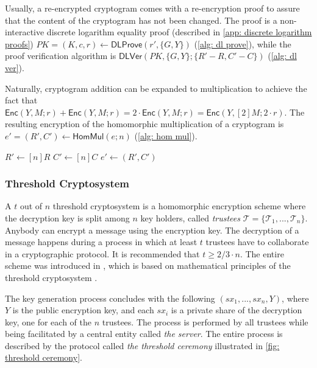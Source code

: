 Usually, a re-encrypted cryptogram comes with a re-encryption proof to assure that the content of the cryptogram has not been changed. The proof is a non-interactive discrete logarithm equality proof (described in \cref{app: discrete logarithm proofs}) $PK = (K, c, r) \gets \mathsf{DLProve} (r', \{ G, Y \})$ (\cref{alg: dl prove}), while the proof verification algorithm is $\mathsf{DLVer} (PK, \{ G, Y \}; \{ R'-R, C'-C \})$ (\cref{alg: dl ver}).

Naturally, cryptogram addition can be expanded to multiplication to achieve the fact that $\mathsf{Enc}(Y, M; r) + \mathsf{Enc}(Y, M; r) = 2 \cdot \mathsf{Enc}(Y, M; r) = \mathsf{Enc}(Y, [2]M; 2 \cdot r)$. The resulting encryption of the homomorphic multiplication of a cryptogram is $e' = (R', C') \gets \mathsf{HomMul}(e; n)$ (\cref{alg: hom mul}).

\begin{algorithm}[ht]
    \DontPrintSemicolon
    \caption{$\mathsf{HomMul} (e; n)$}
    \label{alg: hom mul}
    
    $R' \gets [n]R$ \;
    $C' \gets [n]C$ \;
    $e' \gets (R', C')$ \;
     
\end{algorithm}


\subsubsection{Threshold Cryptosystem} \label{app: threshold cryptosystem}
A $t$ out of $n$ threshold cryptosystem is a homomorphic encryption scheme where the decryption key is split among $n$ key holders, called \textit{trustees} $\boldsymbol{\mathcal{T}} = \{ \mathcal{T}_1, ..., \mathcal{T}_n \}$. Anybody can encrypt a message using the encryption key. The decryption of a message happens during a process in which at least $t$ trustees have to collaborate in a cryptographic protocol. It is recommended that $t \geq 2/3 \cdot n$. The entire scheme was introduced in \cite{Pedersen91}, which is based on mathematical principles of the threshold cryptosystem \cite{Desmedt89, Shamir79}.

The key generation process concludes with the following $(sx_1, ..., sx_n, Y)$, where $Y$ is the public encryption key, and each $sx_i$ is a private share of the decryption key, one for each of the $n$ trustees. The process is performed by all trustees while being facilitated by a central entity called \textit{the server}. The entire process is described by the protocol called \textit{the threshold ceremony} illustrated in \cref{fig: threshold ceremony}.

